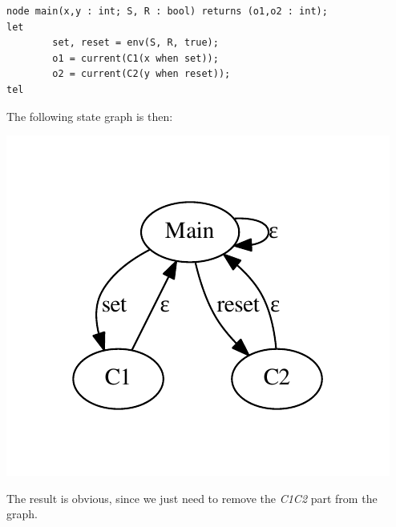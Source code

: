 \documentclass{article}
\begin{document}
\begin{verbatim}
node main(x,y : int; S, R : bool) returns (o1,o2 : int);
let
        set, reset = env(S, R, true);
        o1 = current(C1(x when set));
        o2 = current(C2(y when reset));
tel
\end{verbatim}

The following state graph is then:

\begin{center}
\includegraphics{asyn_strict.pdf}
\end{center}

The result is obvious, since we just need to remove the \emph{C1C2} part from
the graph.
\end{document}
